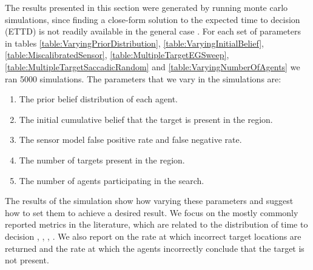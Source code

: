 



The results presented in this section were generated by running monte carlo simulations, since finding a close-form solution to the expected time to decision (ETTD) is not readily available in the general case \cite{Chung2012AnalysisStrategies}. %
For each set of parameters in tables \ref{table:VaryingPriorDistribution}, \ref{table:VaryingInitialBelief}, \ref{table:MiscalibratedSensor}, \ref{table:MultipleTargetEGSweep}, \ref{table:MultipleTargetSaccadicRandom} and \ref{table:VaryingNumberOfAgents} we ran 5000 simulations. The parameters that we vary in the simulations are: 
\begin{enumerate}
    \item The prior belief distribution of each agent.
    \item The initial cumulative belief that the target is present in the region.
    \item The sensor model false positive rate and false negative rate.
    \item The number of targets present in the region.
    \item The number of agents participating in the search.
\end{enumerate}
The results of the simulation show how varying these parameters and suggest how to set them to achieve a desired result. We focus on the mostly commonly reported metrics in the literature, which are related to the distribution of time to decision \cite{Chung2012AnalysisStrategies}, \cite{Waharte2010ProbabilisticRAVs}, \cite{Waharte2010SupportingRAVs}, \cite{Lau2007OptimalEnvironments}. We also report on the rate at which incorrect target locations are returned and the rate at which the agents incorrectly conclude that the target is not present. 

